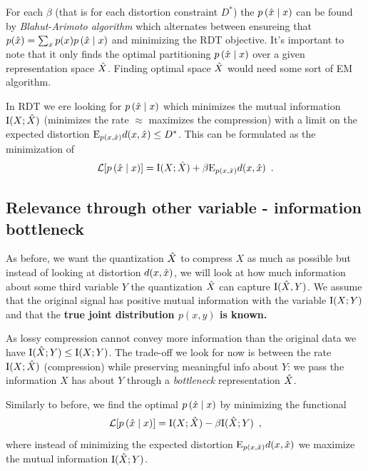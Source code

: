 For each $\beta$ (that is for each distortion constraint $D^*$) the $p \left( \hat{x} \mid x \right)$ can be found by \emph{Blahut-Arimoto algorithm} which alternates between ensureing that $p(\hat{x}) = \sum_x p(x) p \left( \hat{x} \mid x \right)$ and minimizing the RDT objective.
It's important to note that it only finds the optimal partitioning $p \left( \hat{x} \mid x \right)$ over a given representation space $\hat{X}$.
Finding optimal space $\hat{X}$ would need some sort of EM algorithm.

\begin{notebox}
\tldr In RDT we ere looking for $p \left( \hat{x} \mid x \right)$ which minimizes the mutual information $\mathrm{I}(X; \hat{X})$ (minimizes the rate $\approx$ maximizes the compression) with a limit on the expected distortion $\mathrm{E}_{p(x, \hat{x})} d(x, \hat{x}) \leq D^*$. This can be formulated as the minimization of 
\begin{equation}
\mathcal{L}[ p \left( \hat{x} \mid x \right)] = \mathrm{I}(X; \hat{X}) + \beta \mathrm{E}_{p(x, \hat{x})} d(x, \hat{x}) \enspace .
\end{equation}
\end{notebox}

\subsection{Relevance through other variable - information bottleneck}

As before, we want the quantization $\hat{X}$ to compress $X$ as much as possible but instead of looking at distortion $d(x, \hat{x})$, we will look at how much information about some third variable $Y$ the quantization $\hat{X}$ can capture $\mathrm{I}(\hat{X}, Y)$.
We assume that the original signal has positive mutual information with the variable $\mathrm{I}(X; Y)$ and that the \textbf{true joint distribution $p(x, y)$ is known.}

As lossy compression cannot convey more information than the original data we have $\mathrm{I}(\hat{X}; Y) \leq \mathrm{I}(X; Y)$.
The trade-off we look for now is between the rate $\mathrm{I}(X; \hat{X})$ (compression) while preserving meaningful info about $Y$: we pass the information $X$ has about $Y$ through a \emph{bottleneck} representation $\hat{X}$.

Similarly to before, we find the optimal $p \left( \hat{x} \mid x \right)$ by minimizing the functional
\begin{equation}
\mathcal{L}[ p \left( \hat{x} \mid x \right)] = \mathrm{I}(X; \hat{X}) - \beta \mathrm{I}(\hat{X}; Y) \enspace ,
\end{equation}
where instead of minimizing the expected distortion $\mathrm{E}_{p(x, \hat{x})} d(x, \hat{x})$ we maximize the mutual information $\mathrm{I}(\hat{X}; Y)$.

